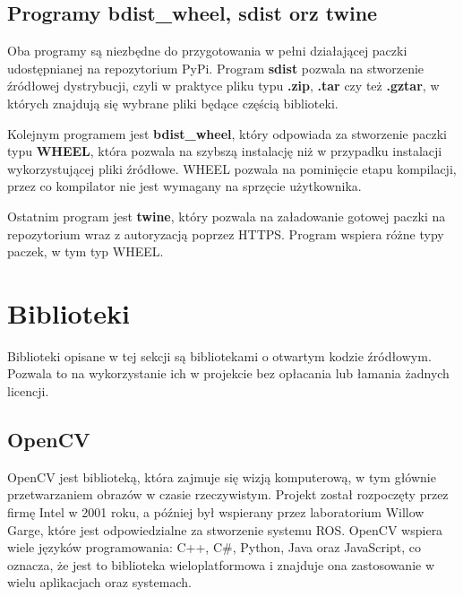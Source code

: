 \subsection{Programy bdist\_wheel, sdist orz twine}
\quad Oba programy są niezbędne do przygotowania w pełni działającej paczki udostępnianej na repozytorium PyPi. Program \textbf{sdist} pozwala na stworzenie źródłowej dystrybucji, czyli w praktyce pliku typu \textbf{.zip}, \textbf{.tar} czy też \textbf{.gztar}, w których znajdują się wybrane pliki będące częścią biblioteki. 

\quad Kolejnym programem jest \textbf{bdist\_wheel}, który odpowiada za stworzenie paczki typu \textbf{WHEEL}, która pozwala na szybszą instalację niż w przypadku instalacji wykorzystującej pliki źródłowe. WHEEL pozwala na pominięcie etapu kompilacji, przez co kompilator nie jest wymagany na sprzęcie użytkownika. 

\quad Ostatnim program jest \textbf{twine}, który pozwala na załadowanie gotowej paczki na repozytorium wraz z autoryzacją poprzez HTTPS. Program wspiera różne typy paczek, w tym typ WHEEL. 



\section{Biblioteki}

\quad Biblioteki opisane w tej sekcji są bibliotekami o otwartym kodzie źródłowym. Pozwala to na wykorzystanie ich w projekcie bez opłacania lub łamania żadnych licencji. 

\subsection{OpenCV}

\quad OpenCV jest biblioteką, która zajmuje się wizją komputerową, w tym głównie przetwarzaniem obrazów w czasie rzeczywistym. Projekt został rozpoczęty przez firmę Intel w 2001 roku, a później był wspierany przez laboratorium Willow Garge, które jest odpowiedzialne za stworzenie systemu ROS. OpenCV wspiera wiele języków programowania: C++, C\#, Python, Java oraz JavaScript, co oznacza, że jest to biblioteka wieloplatformowa i znajduje ona zastosowanie w wielu aplikacjach oraz systemach. 

